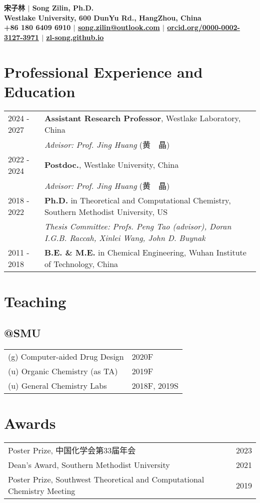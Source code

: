 \documentclass{article}
\begin{document}
\centering
{\bf
  \LARGE 宋子林 $\vert$ Song Zilin, Ph.D. \\
  \vspace{0.05in}\normalsize Westlake University, 600 DunYu Rd., HangZhou, China \\
  +86 180 6409 6910 $\vert$ \href{mailto:song.zilin@outlook.com}{song.zilin@outlook.com} $\vert$ \href{https://orcid.org/0000-0002-3127-3971}{orcid.org/0000-0002-3127-3971} $\vert$ \href{https://zl-song.github.io/}{zl-song.github.io} }

\section*{Professional Experience and Education}
\begin{tabularx}{\linewidth}{l|X}
2024 - 2027 & \textbf{Assistant Research Professor}, Westlake Laboratory, China \\
            & \textit{Advisor: Prof. Jing Huang} (黄\ \ 晶) \\
2022 - 2024 & \textbf{Postdoc.}, Westlake University, China \\
            & \textit{Advisor: Prof. Jing Huang} (黄\ \ 晶) \\
2018 - 2022 & \textbf{Ph.D.} in Theoretical and Computational Chemistry, Southern Methodist University, US \\
            & \textit{Thesis Committee: Profs. Peng Tao (advisor), Doran I.G.B. Raccah, Xinlei Wang, John D. Buynak} \\
2011 - 2018 & \textbf{B.E. \& M.E.} in Chemical Engineering, Wuhan Institute of Technology, China
\end{tabularx}

\section*{Teaching}
\subsection*{@SMU}
\begin{tabularx}{\linewidth}{l|X}
  (g) Computer-aided Drug Design & 2020F \\
  (u) Organic Chemistry (as TA)  & 2019F \\
  (u) General Chemistry Labs     & 2018F, 2019S
\end{tabularx}

\section*{Awards}
\begin{tabularx}{\linewidth}{Xr}
Poster Prize, 中国化学会第33届年会               & 2023  \\
Dean's Award, Southern Methodist University                              & 2021  \\
Poster Prize, Southwest Theoretical and Computational Chemistry Meeting  & 2019  \\
\end{tabularx}
\end{document}
